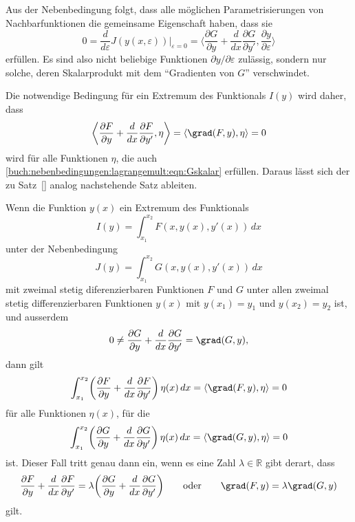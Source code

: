 Aus der Nebenbedingung folgt, dass alle möglichen Parametrisierungen
von Nachbarfunktionen die gemeinsame Eigenschaft haben, dass sie
\begin{equation}
0
=
\frac{d}{d\varepsilon}J(y(x,\varepsilon))\bigg|_{\varepsilon=0}
=
\biggl\langle
\frac{\partial G}{\partial y}+\frac{d}{dx}\frac{\partial G}{\partial y'}
,
\frac{\partial y}{\partial \varepsilon}
\biggr\rangle
\label{buch:nebenbedingungen:lagrangemult:eqn:Gskalar}
\end{equation}
erfüllen.
Es sind also nicht beliebige Funktionen $\partial y/\partial \varepsilon$
zulässig, sondern nur solche, deren Skalarprodukt mit dem
``Gradienten von $G$'' verschwindet.

Die notwendige Bedingung für ein Extremum des Funktionals $I(y)$ wird 
daher, dass
\[
\biggl\langle
\frac{\partial F}{\partial y} + \frac{d}{dx}\frac{\partial F}{\partial y'},
\eta
\biggr\rangle
=
\langle
\grad(F,y),
\eta
\rangle
=
0
\]
wird für alle Funktionen $\eta$, die auch
\eqref{buch:nebenbedingungen:lagrangemult:eqn:Gskalar}
erfüllen.
Daraus lässt sich der zu Satz~\ref{}
analog nachstehende Satz ableiten.

\begin{satz}
\label{buch:nebenbedingungen:lagrangemult:satz:einenb}
Wenn die Funktion $y(x)$ ein Extremum des Funktionals
\[
I(y) = \int_{x_1}^{x_2} F(x,y(x),y'(x))\,dx
\]
unter der Nebenbedingung
\[
J(y) = \int_{x_1}^{x_2} G(x,y(x),y'(x))\,dx
\]
mit zweimal stetig diferenzierbaren Funktionen $F$ und $G$
unter allen zweimal stetig differenzierbaren Funktionen $y(x)$
mit $y(x_1)=y_1$ und $y(x_2)=y_2$ ist,
und ausserdem
\[
0
\ne
\frac{\partial G}{\partial y}+\frac{d}{dx}\frac{\partial G}{\partial y'}
=
\grad (G,y),
\]
dann gilt
\[
\int_{x_1}^{x_2}
\biggl(
\frac{\partial F}{\partial y}
+
\frac{d}{dx}\frac{\partial F}{\partial y'}
\biggr)\,
\eta(x)\,dx
=
\langle
\grad (F,y),\eta
\rangle
=0
\]
für alle Funktionen $\eta(x)$, für die
\[
\int_{x_1}^{x_2}
\biggl(
\frac{\partial G}{\partial y}
+
\frac{d}{dx}\frac{\partial G}{\partial y'}
\biggr)\,
\eta(x)\,dx
=
\langle
\grad (G,y),\eta
\rangle
=0
\]
ist.
Dieser Fall tritt genau dann ein, wenn es eine Zahl $\lambda\in\mathbb{R}$
gibt derart, dass
\begin{equation}
\frac{\partial F}{\partial y}
+
\frac{d}{dx}\frac{\partial F}{\partial y'}
=
\lambda
\biggl(
\frac{\partial G}{\partial y}
+
\frac{d}{dx}\frac{\partial G}{\partial y'}
\biggr)
\qquad\text{oder}\qquad
\grad (F,y) = \lambda \grad(G,y)
\label{buch:nebenbedingungen:lagrangemult:notwendig}
\end{equation}
gilt.
\end{satz}

